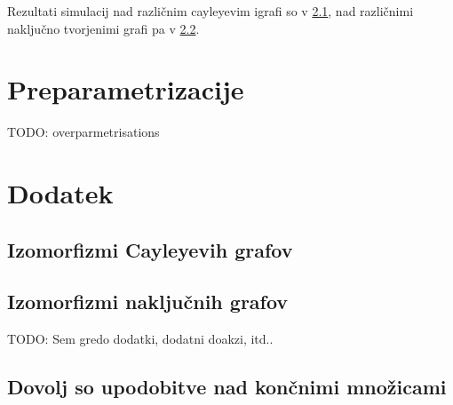 \documentclass[mat2, tisk]{fmfdelo}
\newcommand{\TODO}[1]{{\color{blue} TODO: #1}}
\begin{document}
Rezultati simulacij nad različnim cayleyevim igrafi so v \ref{dodatek:cayley},
nad različnimi naključno tvorjenimi grafi pa v  \ref{dodatek:naključni grafi}.
 
\section{Preparametrizacije}
\TODO{overparmetrisations}

\section{Dodatek}
\subsection{Izomorfizmi Cayleyevih grafov}
\label{dodatek:cayley}


         


 \subsection{Izomorfizmi naključnih grafov}
\label{dodatek:naključni grafi}
\TODO{Sem gredo dodatki, dodatni doakzi, itd..}
\subsection{Dovolj so upodobitve nad končnimi množicami}
    




\end{document}
